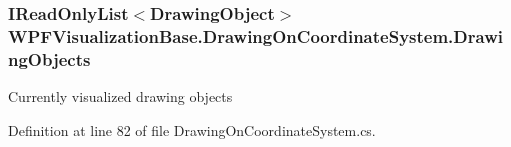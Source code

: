 \subsubsection[{\texorpdfstring{Drawing\+Objects}{DrawingObjects}}]{\setlength{\rightskip}{0pt plus 5cm}I\+Read\+Only\+List$<${\bf Drawing\+Object}$>$ W\+P\+F\+Visualization\+Base.\+Drawing\+On\+Coordinate\+System.\+Drawing\+Objects\hspace{0.3cm}{\ttfamily [get]}}\hypertarget{class_w_p_f_visualization_base_1_1_drawing_on_coordinate_system_a7ac738ab1fbb3159f586cc6f55675c45}{}\label{class_w_p_f_visualization_base_1_1_drawing_on_coordinate_system_a7ac738ab1fbb3159f586cc6f55675c45}


Currently visualized drawing objects 



Definition at line 82 of file Drawing\+On\+Coordinate\+System.\+cs.

